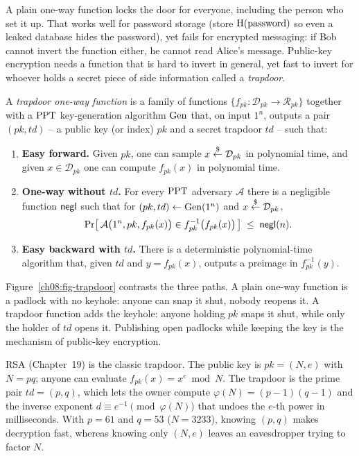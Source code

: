 A plain one-way function locks the door for everyone, including the person who set it up. That works well for password storage (store $\operatorname{H}(\text{password})$ so even a leaked database hides the password), yet fails for encrypted messaging: if Bob cannot invert the function either, he cannot read Alice's message. Public-key encryption needs a function that is hard to invert in general, yet fast to invert for whoever holds a secret piece of side information called a \emph{trapdoor}.

\begin{definition}
\label{ch08:def-tdf}
A \emph{trapdoor one-way function} is a family of functions $\{f_{pk} : \mathcal{D}_{pk} \to \mathcal{R}_{pk}\}$ together with a $\mathrm{PPT}$ key-generation algorithm $\operatorname{Gen}$ that, on input $1^{n}$, outputs a pair $(pk, td)$ -- a public key (or index) $pk$ and a secret trapdoor $td$ -- such that:
\begin{enumerate}
\item \textbf{Easy forward.} Given $pk$, one can sample $x \stackrel{\$}{\gets} \mathcal{D}_{pk}$ in polynomial time, and given $x \in \mathcal{D}_{pk}$ one can compute $f_{pk}(x)$ in polynomial time.
\item \textbf{One-way without $td$.} For every $\mathrm{PPT}$ adversary $\mathcal A$ there is a negligible function $\mathsf{negl}$ such that for $(pk, td) \gets \operatorname{Gen}(1^{n})$ and $x \stackrel{\$}{\gets} \mathcal{D}_{pk}$,
\[
\Pr\bigl[\, \mathcal A\bigl(1^{n}, pk, f_{pk}(x)\bigr) \in f_{pk}^{-1}\bigl(f_{pk}(x)\bigr) \,\bigr] \;\le\; \mathsf{negl}(n).
\]
\item \textbf{Easy backward with $td$.} There is a deterministic polynomial-time algorithm that, given $td$ and $y = f_{pk}(x)$, outputs a preimage in $f_{pk}^{-1}(y)$.
\end{enumerate}
\end{definition}

Figure~\ref{ch08:fig-trapdoor} contrasts the three paths. A plain one-way function is a padlock with no keyhole: anyone can snap it shut, nobody reopens it. A trapdoor function adds the keyhole: anyone holding $pk$ snaps it shut, while only the holder of $td$ opens it. Publishing open padlocks while keeping the key is the mechanism of public-key encryption.

\begin{intuitionbox}
RSA (Chapter~19) is the classic trapdoor. The public key is $pk = (N, e)$ with $N = pq$; anyone can evaluate $f_{pk}(x) = x^{e}\bmod N$. The trapdoor is the prime pair $td = (p, q)$, which lets the owner compute $\varphi(N) = (p-1)(q-1)$ and the inverse exponent $d \equiv e^{-1} \pmod{\varphi(N)}$ that undoes the $e$-th power in milliseconds. With $p=61$ and $q=53$ ($N=3233$), knowing $(p,q)$ makes decryption fast, whereas knowing only $(N, e)$ leaves an eavesdropper trying to factor $N$.
\end{intuitionbox}

